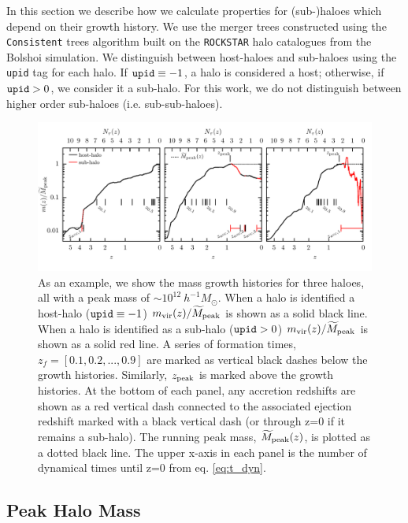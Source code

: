 \documentclass[a4paper,fleqn,usenatbib]{mnras}
\begin{document}
In this section we describe how we calculate properties for (sub-)haloes which depend on their growth history.  We use the merger trees constructed using the {\tt Consistent} trees algorithm \citep{Behroozi:2013dz} built on the {\tt ROCKSTAR} halo catalogues from the Bolshoi simulation.  We distinguish between host-haloes and sub-haloes using the {\tt upid} tag for each halo.  If $ {\tt upid} \equiv -1$, a halo is considered a host; otherwise, if ${\tt upid} > 0$, we consider it a sub-halo.  For this work, we do not distinguish between higher order sub-haloes (i.e. sub-sub-haloes).

\begin{figure}
    \includegraphics{figures/growth_hist.pdf}
    \caption{As an example, we show the mass growth histories for three haloes, all with a peak mass of $\sim 10^{12}~h^{-1}M_{\odot}$.  When a halo is identified a host-halo (${\tt upid} \equiv -1$) $m_{\rm vir}(z)/\widetilde{M}_{\rm peak}$ is shown as a solid black line.  When a halo is identified as a sub-halo (${\tt upid} > 0$) $m_{\rm vir}(z)/\widetilde{M}_{\rm peak}$ is shown as a solid red line.  A series of formation times, $z_{f} = [0.1,0.2,...,0.9]$ are marked as vertical black dashes below the growth histories.  Similarly, $z_{\rm peak}$ is marked above the growth histories.  At the bottom of each panel, any accretion redshifts are shown as a red vertical dash connected to the associated ejection redshift marked with a black vertical dash (or through z=0 if it remains a sub-halo).  The running peak mass, $\widetilde{M}_{\rm peak}(z)$, is plotted as a dotted black line.  The upper x-axis in each panel is the number of dynamical times until z=0 from eq. \ref{eq:t_dyn}.}
    \label{fig:growth_hist}
\end{figure}

\subsection{Peak Halo Mass}
\end{document}
